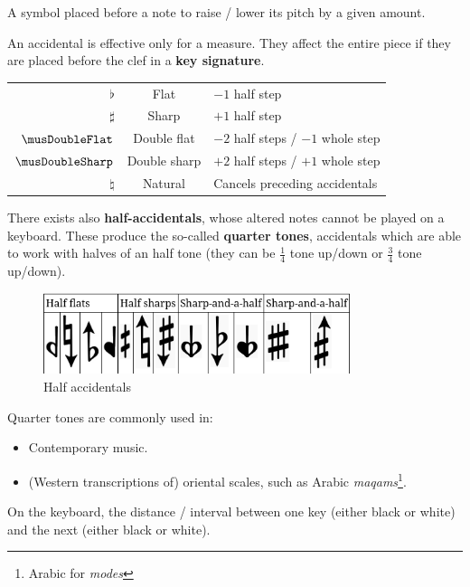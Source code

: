 \begin{definition}[Accidental]
    A symbol placed before a note to raise / lower its pitch by a given amount.
\end{definition}

An accidental is effective only for a measure. They affect the entire piece if they are placed before the clef in a \textbf{key signature}.
\begin{center}
    \begin{tabular}{r|c|l}
        $\flat{}$ & Flat & $-1$ half step \\
        $\sharp{}$ & Sharp & $+1$ half step \\
        $\musDoubleFlat$ & Double flat & $-2$ half steps / $-1$ whole step \\
        $\musDoubleSharp$ & Double sharp & $+2$ half steps / $+1$ whole step \\
        $\natural{}$ & Natural & Cancels preceding accidentals \\
    \end{tabular}
\end{center}
There exists also \textbf{half-accidentals}, whose altered notes cannot be played on a keyboard.
These produce the so-called \textbf{quarter tones}, accidentals which are able to work with halves of an half tone (they can be $\frac 1 4$ tone up/down or $\frac 3 4$ tone up/down).

\begin{figure}[h]
    \begin{center}
        \includegraphics[width=0.8\textwidth]{img/halfaccidentals}
        \caption{Half accidentals}
    \end{center}
\end{figure}

Quarter tones are commonly used in:
\begin{itemize}
    \item Contemporary music.
    \item (Western transcriptions of) oriental scales, such as Arabic \emph{maqams}\footnote{Arabic for \emph{modes}}.
\end{itemize}

\begin{definition}
    On the keyboard, the distance / interval between one key (either black or white) and the next (either black or white).
\end{definition}

